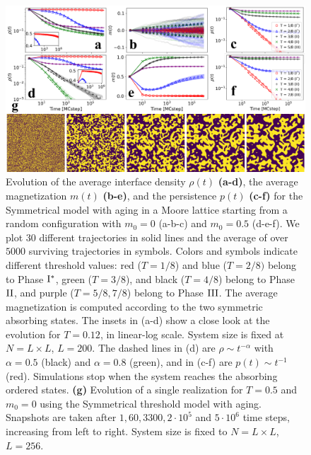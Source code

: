 \begin{figure}[ht]
    \centering \captionsetup{font=sf}
    \includegraphics[width=\linewidth]{Figs/Aging_STM/FIG12_THESIS.pdf}
    \caption[Modified dynamical regimes by aging in a Moore lattice]{\label{fig:evolution_lattice_aging} Evolution of the average interface density $\rho(t)$ \textbf{(a-d)}, the average magnetization $m(t)$ \textbf{(b-e)}, and the persistence $p(t)$ \textbf{(c-f)} for the Symmetrical model with aging in a Moore lattice starting from a random configuration with $m_0 = 0$ (a-b-c) and $m_0 = 0.5$ (d-e-f). We plot 30 different trajectories in solid lines and the average of over $5000$ surviving trajectories in symbols. Colors and symbols indicate different threshold values: red ($T = 1/8$) and blue ($T = 2/8)$ belong to Phase ${\rm I}^{*}$, green ($T = 3/8$), and black ($T=4/8$) belong to Phase ${\rm II}$, and purple ($T = 5/8, 7/8$) belong to Phase ${\rm III}$. The average magnetization is computed according to the two symmetric absorbing states. The insets in (a-d) show a close look at the evolution for $T = 0.12$, in linear-log scale. System size is fixed at $N = L \times L$, $L = 200$. The dashed lines in (d) are $\rho \sim t^{-\alpha}$ with $\alpha = 0.5$ (black) and $\alpha = 0.8$ (green), and in (c-f) are $p(t) \sim t^{-1}$ (red). %
    Simulations stop when the system reaches the absorbing ordered states. \textbf{(g)} Evolution of a single realization for $T = 0.5$ and $m_0 = 0$ using the Symmetrical threshold model with aging. Snapshots are taken after $1,60,3300,2 \cdot 10^5$ and $5 \cdot 10^6$ time steps, increasing from left to right. System size is fixed to $N = L \times L$, $L = 256$.}
\end{figure}
